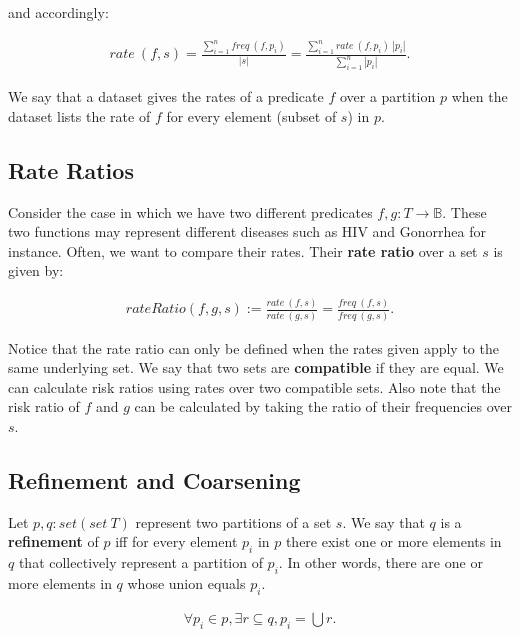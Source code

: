 \documentclass[]{article}
\begin{document}
and accordingly:

\begin{align}
rate\ (f, s) = \frac{\sum_{i=1}^n freq\ (f, p_i)}{|s|} = \frac{\sum_{i=1}^n rate\ (f, p_i)\ |p_i|}{\sum_{i=1}^n|p_i|}.
\end{align}

We say that a dataset gives the rates of a predicate \(f\) over a
partition \(p\) when the dataset lists the rate of \(f\) for every
element (subset of \(s\)) in \(p\).

\hypertarget{rate-ratios}{%
\subsection{Rate Ratios}\label{rate-ratios}}

Consider the case in which we have two different predicates
\(f, g: T \rightarrow \mathbb{B}\). These two functions may represent
different diseases such as HIV and Gonorrhea for instance. Often, we
want to compare their rates. Their \textbf{rate ratio} over a set \(s\)
is given by:

\begin{align*}
rateRatio (f, g, s) := \frac{rate\ (f, s)}{rate\ (g, s)} = \frac{freq\ (f, s)}{freq\ (g, s)}.
\end{align*}

Notice that the rate ratio can only be defined when the rates given
apply to the same underlying set. We say that two sets are
\textbf{compatible} if they are equal. We can calculate risk ratios
using rates over two compatible sets. Also note that the risk ratio of
\(f\) and \(g\) can be calculated by taking the ratio of their
frequencies over \(s\).

\hypertarget{refinement-and-coarsening}{%
\subsection{Refinement and Coarsening}\label{refinement-and-coarsening}}

Let \(p, q : set (set\ T)\) represent two partitions of a set \(s\). We
say that \(q\) is a \textbf{refinement} of \(p\) iff for every element
\(p_i\) in \(p\) there exist one or more elements in \(q\) that
collectively represent a partition of \(p_i\). In other words, there are
one or more elements in \(q\) whose union equals \(p_i\).

\begin{align*}
\forall p_i \in p, \exists r \subseteq q, p_i = \bigcup r. 
\end{align*}
\end{document}
